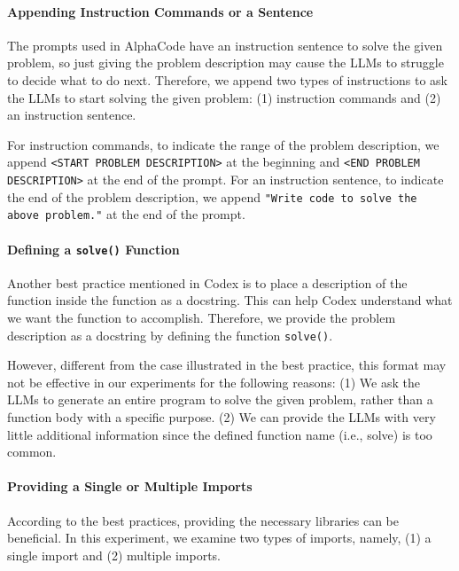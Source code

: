 \documentclass{article}
\begin{document}
\paragraph{Appending Instruction Commands or a Sentence}

The prompts used in AlphaCode have an instruction sentence to solve the given problem, so just giving the problem description may cause the LLMs to struggle to decide what to do next.
Therefore, we append two types of instructions to ask the LLMs to start solving the given problem: (1) instruction commands and (2) an instruction sentence.

For instruction commands, to indicate the range of the problem description, we append \texttt{\textless START PROBLEM DESCRIPTION\textgreater} at the beginning and \texttt{\textless END PROBLEM DESCRIPTION\textgreater} at the end of the prompt.
For an instruction sentence, to indicate the end of the problem description, we append \texttt{"Write code to solve the above problem."} at the end of the prompt.



\paragraph{Defining a \texttt{solve()} Function}

Another best practice mentioned in Codex is to place a description of the function inside the function as a docstring.
This can help Codex understand what we want the function to accomplish.
Therefore, we provide the problem description as a docstring by defining the function \texttt{solve()}.

However, different from the case illustrated in the best practice, this format may not be effective in our experiments for the following reasons:
(1) We ask the LLMs to generate an entire program to solve the given problem, rather than a function body with a specific purpose.
(2) We can provide the LLMs with very little additional information since the defined function name (i.e., solve) is too common.



\paragraph{Providing a Single or Multiple Imports}

According to the best practices, providing the necessary libraries can be beneficial.
In this experiment, we examine two types of imports, namely, (1) a single import and (2) multiple imports.
\end{document}
